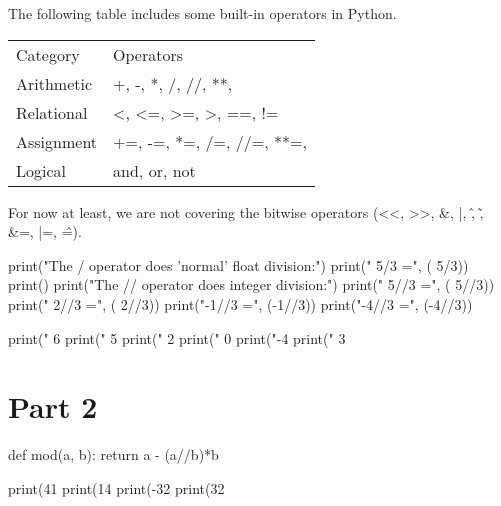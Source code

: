 \begin{flex}

\begin{gram}
The following table includes some built-in operators in Python.

\begin{tabular}{ll}
Category &	Operators
\\
Arithmetic &	+, -, *, /, //, **, %
\\
Relational &	\textless, \textless=, \textgreater=, \textgreater, ==, !=
\\
Assignment &	+=, -=, *=, /=, //=, **=, %
\\
Logical &	and, or, not
\end{tabular}
\end{gram}

\begin{note}
For now at least, we are not covering the bitwise operators (\textless\textless, \textgreater\textgreater, \&, |, \^, \~, \&=, |=, \^=).
\end{note}
\end{flex}

\begin{runpython}[title=Integer Division]    
print("The / operator does 'normal' float division:")
print(" 5/3  =", ( 5/3))
print()
print("The // operator does integer division:")
print(" 5//3 =", ( 5//3))
print(" 2//3 =", ( 2//3))
print("-1//3 =", (-1//3))
print("-4//3 =", (-4//3))
\end{runpython}


\begin{runpython}[title=The Modulus or Remainder Operator (\%)]
print(" 6%
print(" 5%
print(" 2%
print(" 0%
print("-4%
print(" 3%
\end{runpython}


\section{Part 2}

\begin{runpython}[title=More of the Modulus or Remainder Operator (\%) verify that (a\%b) is equivalent to (a - (a//b)*b)]

def mod(a, b):
  return a - (a//b)*b

print(41%
print(14%
print(-32%
print(32%
\end{runpython}


